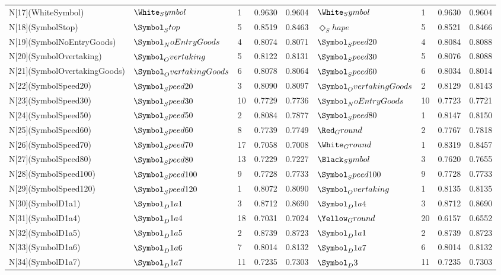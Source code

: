 \begin{tabular}{lllllllll}
N[17](WhiteSymbol) & $\White_Symbol$ & 1 & 0.9630 & 0.9604 & $\White_Symbol$ & 1 & 0.9630 & 0.9604 \\
N[18](SymbolStop) & $\Symbol_Stop$ & 5 & 0.8519 & 0.8463 & $\Diamond_Shape$ & 5 & 0.8521 & 0.8466 \\
N[19](SymbolNoEntryGoods) & $\Symbol_NoEntryGoods$ & 4 & 0.8074 & 0.8071 & $\Symbol_Speed20$ & 4 & 0.8084 & 0.8088 \\
N[20](SymbolOvertaking) & $\Symbol_Overtaking$ & 5 & 0.8122 & 0.8131 & $\Symbol_Speed30$ & 5 & 0.8076 & 0.8088 \\
N[21](SymbolOvertakingGoods) & $\Symbol_OvertakingGoods$ & 6 & 0.8078 & 0.8064 & $\Symbol_Speed60$ & 6 & 0.8034 & 0.8014 \\
N[22](SymbolSpeed20) & $\Symbol_Speed20$ & 3 & 0.8090 & 0.8097 & $\Symbol_OvertakingGoods$ & 2 & 0.8129 & 0.8143 \\
N[23](SymbolSpeed30) & $\Symbol_Speed30$ & 10 & 0.7729 & 0.7736 & $\Symbol_NoEntryGoods$ & 10 & 0.7723 & 0.7721 \\
N[24](SymbolSpeed50) & $\Symbol_Speed50$ & 2 & 0.8084 & 0.7877 & $\Symbol_Speed80$ & 1 & 0.8147 & 0.8150 \\
N[25](SymbolSpeed60) & $\Symbol_Speed60$ & 8 & 0.7739 & 0.7749 & $\Red_Ground$ & 2 & 0.7767 & 0.7818 \\
N[26](SymbolSpeed70) & $\Symbol_Speed70$ & 17 & 0.7058 & 0.7008 & $\White_Ground$ & 1 & 0.8319 & 0.8457 \\
N[27](SymbolSpeed80) & $\Symbol_Speed80$ & 13 & 0.7229 & 0.7227 & $\Black_Symbol$ & 3 & 0.7620 & 0.7655 \\
N[28](SymbolSpeed100) & $\Symbol_Speed100$ & 9 & 0.7728 & 0.7733 & $\Symbol_Speed100$ & 9 & 0.7728 & 0.7733 \\
N[29](SymbolSpeed120) & $\Symbol_Speed120$ & 1 & 0.8072 & 0.8090 & $\Symbol_Overtaking$ & 1 & 0.8135 & 0.8135 \\
N[30](SymbolD1a1) & $\Symbol_D1a1$ & 3 & 0.8712 & 0.8690 & $\Symbol_D1a4$ & 3 & 0.8712 & 0.8690 \\
N[31](SymbolD1a4) & $\Symbol_D1a4$ & 18 & 0.7031 & 0.7024 & $\Yellow_Ground$ & 20 & 0.6157 & 0.6552 \\
N[32](SymbolD1a5) & $\Symbol_D1a5$ & 2 & 0.8739 & 0.8723 & $\Symbol_D1a1$ & 2 & 0.8739 & 0.8723 \\
N[33](SymbolD1a6) & $\Symbol_D1a6$ & 7 & 0.8014 & 0.8132 & $\Symbol_D1a7$ & 6 & 0.8014 & 0.8132 \\
N[34](SymbolD1a7) & $\Symbol_D1a7$ & 11 & 0.7235 & 0.7303 & $\Symbol_D3$ & 11 & 0.7235 & 0.7303 \\

\end{tabular}

